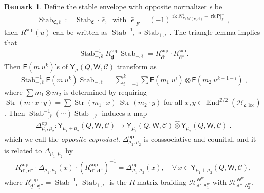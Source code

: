 \documentclass[10pt]{amsart}
\theoremstyle{definition}
\newtheorem{Remark}[Theorem]{Remark}
\numberwithin{equation}{section}
\newcommand{\bZ}{\mathbb{Z}}
\newcommand{\bv}{\mathbf{v}}
\newcommand{\bd}{\mathbf{d}}
\newcommand{\cH}{\mathcal{H}}
\newcommand{\cM}{\mathcal{M}}
\newcommand{\fC}{\mathfrak{C}}
\newcommand{\loc}{\mathrm{loc}}
\newcommand{\sA}{\mathsf{A}}
\newcommand{\sW}{\mathsf{W}}
\newcommand{\End}{\operatorname{End}}
\newcommand{\rk}{\operatorname{rk}}
\newcommand{\Stab}{\operatorname{Stab}}
\newcommand{\str}{\operatorname{Str}}
\begin{document}
\begin{Remark}\label{rmk opposite coproduct}
Define the stable envelope with opposite normalizer $\bar\epsilon$ be
\begin{align*}
    \Stab_{\fC,\bar\epsilon}:=\Stab_{\fC}\cdot\, \bar\epsilon,\;\text{ with }\; \bar\epsilon|_F=(-1)^{\rk N^+_{F/\cM(\bv,\underline{\bd})}+\rk \mathsf P|_F^-}\;,
\end{align*}
then $R^{\mathrm{sup}}(u)$ can be written as $\Stab_{-,\bar\epsilon}^{-1}\circ \Stab_{+,\epsilon}$.
The triangle lemma implies that
\begin{align*}
\Stab_{-,\bar\epsilon}^{-1}R^{\mathrm{sup}}_{\underline{\bd}}\Stab_{-,\bar\epsilon}=R^{\mathrm{sup}}_{\underline{\bd}'}\cdot R^{\mathrm{sup}}_{\underline{\bd}''}.
\end{align*}
Then $\mathsf E(m\: u^k)$'s of $\mathsf Y_\mu(Q,\sW,\mathcal C)$ transform as 
\begin{align}
    \Stab_{-,\bar\epsilon}^{-1}\mathsf E(m\: u^k)\Stab_{-,\bar\epsilon}=\sum_{i=-1}^k\sum \mathsf E(m_1\:u^i)\otimes \mathsf E(m_2\:u^{k-1-i})\:,
\end{align}
where $\sum m_1\otimes m_2$ is determined by requiring $\str(m\cdot x \cdot y)=\sum\str(m_1\cdot x)\: \str(m_2\cdot y)$ for all $x,y\in \End^{\bZ/2}(\cH_{\mathfrak{c},\loc})$.
Then $\Stab_{-,\bar\epsilon}^{-1}(\cdots)\Stab_{-,\bar\epsilon}$ induces a map 
\begin{align*}
    \Delta_{\mu_1,\mu_2}^{\mathrm{op}}\colon \mathsf Y_{\mu_1+\mu_2}(Q,\sW,\mathcal C)\to \mathsf Y_{\mu_1}(Q,\sW,\mathcal C)\widehat{\otimes}\mathsf Y_{\mu_2}(Q,\sW,\mathcal C)\:.
\end{align*}
which we call the \textit{opposite coproduct}. $\Delta_{\mu_1,\mu_2}^{\mathrm{op}}$ is coassociative and counital, and it is related to $\Delta_{\mu_1,\mu_2}$ by 
\begin{align*}
    R^{\mathrm{sup}}_{\underline{\bd}',\underline{\bd}''}\cdot \Delta_{\mu_1,\mu_2}(x)\cdot (R^{\mathrm{sup}}_{\underline{\bd}',\underline{\bd}''})^{-1}=\Delta_{\mu_1,\mu_2}^{\mathrm{op}}(x),\quad\forall\, x\in \mathsf Y_{\mu_1+\mu_2}(Q,\sW,\mathcal C),
\end{align*}
where $R^{\mathrm{sup}}_{\underline{\bd}',\underline{\bd}''}=\Stab_{-,\bar\epsilon}^{-1}\Stab_{+,\epsilon}$ is the $R$-matrix braiding $\cH^{\sW^{\mathrm{fr}}}_{\underline{\bd}',\sA^{\mathrm{fr}}_1}$ with $\cH^{\sW^{\mathrm{fr}}}_{\underline{\bd}'',\sA^{\mathrm{fr}}_2}$.
\end{Remark}
\end{document}
